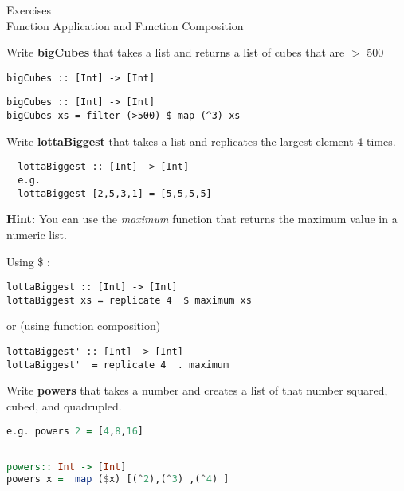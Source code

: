 \documentclass{article}
\newcommand\ExTitle{Function Application and Function Composition}
\newcommand\fullExTitle{Exercises \\ \ExTitle }
\begin{document}
\begin{Huge}
	\begin{center}
	\fullExTitle
	\end{center}
\end{Huge}

\begin{Exercise}[title={Using \$}]

Write \textbf{bigCubes} that takes a list and returns a list of cubes that are $>$ 500
\begin{lstlisting}
bigCubes :: [Int] -> [Int]
  \end{lstlisting}
\end{Exercise}
\begin{Answer}
  \begin{lstlisting}
bigCubes :: [Int] -> [Int]
bigCubes xs = filter (>500) $ map (^3) xs
  \end{lstlisting}
\end{Answer}
\begin{Exercise} [title={Using \$ and .}]
  Write \textbf{lottaBiggest} that takes a list and replicates the largest element 4 times. 
  \begin{lstlisting}
  lottaBiggest :: [Int] -> [Int]
  e.g.
  lottaBiggest [2,5,3,1] = [5,5,5,5]
  \end{lstlisting}
  \textbf{Hint:} You can use the \textit{maximum} function that returns the maximum value in a numeric list. 
\end{Exercise}
\begin{Answer}
  Using \$  :
  \begin{lstlisting}   
lottaBiggest :: [Int] -> [Int]
lottaBiggest xs = replicate 4  $ maximum xs
      \end{lstlisting}

or (using function composition)
\begin{lstlisting}
lottaBiggest' :: [Int] -> [Int]
lottaBiggest'  = replicate 4  . maximum 
          \end{lstlisting}
\end{Answer}
\pagebreak
\begin{Exercise} [title={Using \$}]
Write \textbf{powers} that takes a number and creates a list of that number squared, cubed, and quadrupled. 
\begin{lstlisting}[language=Haskell]
e.g. powers 2 = [4,8,16]
  \end{lstlisting}
\end{Exercise} 
\begin{Answer}
  \begin{lstlisting}[language=Haskell]

powers:: Int -> [Int]
powers x =  map ($x) [(^2),(^3) ,(^4) ] 
\end{lstlisting}
\end{Answer}
\end{document}
